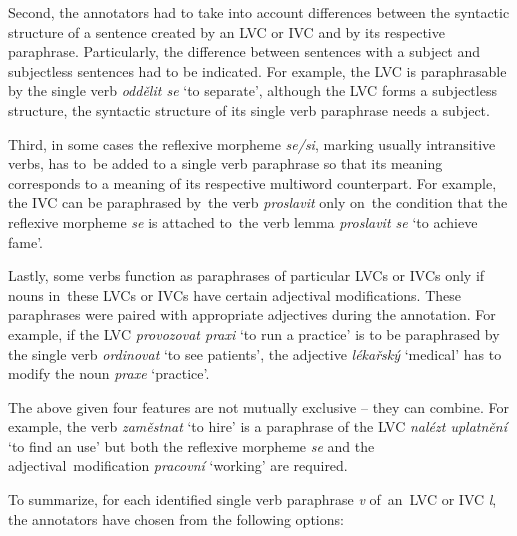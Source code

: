 \documentclass[output=paper
,modfonts
,nonflat]{langsci/langscibook}
\begin{document}
Second, the annotators had to take into account differences between the 
syntactic structure of a sentence created by an LVC or IVC and by its respective 
paraphrase. 
Particularly, the difference between sentences with a subject and subjectless 
sentences had to be indicated. For example, the LVC  is paraphrasable by 
the single verb \textit{oddělit se} `to separate', although the LVC forms a 
subjectless structure, the syntactic structure of its single verb paraphrase 
needs a subject. 

Third, in some cases the reflexive morpheme \textit{se/si}, marking usually 
intransitive verbs, has to~be added to a single verb paraphrase so that its 
meaning corresponds to a meaning of its respective multiword counterpart.
For example, the IVC  can be paraphrased by~the verb \textit{proslavit} only on~the 
condition that the reflexive morpheme \textit{se} is attached to~the verb lemma 
\textit{proslavit se} `to achieve fame'.

Lastly, some verbs function as paraphrases of particular LVCs or IVCs only if 
nouns in~these LVCs or IVCs have certain adjectival modifications. These 
paraphrases were paired with appropriate adjectives during the annotation. 
For example, if the LVC \textit{provozovat praxi} `to run a practice' is to be 
paraphrased by the single verb \textit{ordinovat} `to see patients', 
the adjective \textit{lékařský} `medical' has to modify the noun \textit{praxe} 
`practice'. 

The above given four features are not mutually exclusive -- they can combine. 
For example, the verb \textit{zaměstnat} `to hire' is a paraphrase of the LVC 
\textit{nalézt uplatnění} `to find an use' but both the reflexive morpheme 
\textit{se} and the adjectival~modification \textit{pracovní} `working' are 
required.

To summarize, for each identified single verb paraphrase \textit{v} 
of~an~LVC or IVC \textit{l}, the annotators have chosen from the following 
options:
\end{document}
